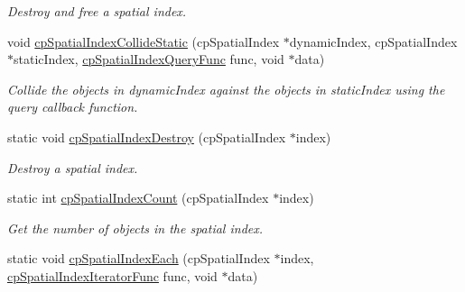 \begin{DoxyCompactItemize}
\begin{DoxyCompactList}\small\item\em Destroy and free a spatial index. \end{DoxyCompactList}\item 
\hypertarget{group__cp_spatial_index_ga8abb667968f231b2f87c7273d4b0e533}{}void \hyperlink{group__cp_spatial_index_ga8abb667968f231b2f87c7273d4b0e533}{cp\+Spatial\+Index\+Collide\+Static} (cp\+Spatial\+Index $\ast$dynamic\+Index, cp\+Spatial\+Index $\ast$static\+Index, \hyperlink{group__cp_spatial_index_ga7bcf80d017b29d32d9f8011405b241f9}{cp\+Spatial\+Index\+Query\+Func} func, void $\ast$data)\label{group__cp_spatial_index_ga8abb667968f231b2f87c7273d4b0e533}

\begin{DoxyCompactList}\small\item\em Collide the objects in {\ttfamily dynamic\+Index} against the objects in {\ttfamily static\+Index} using the query callback function. \end{DoxyCompactList}\item 
\hypertarget{group__cp_spatial_index_ga93050241206687a408b3fda47a3043b5}{}static void \hyperlink{group__cp_spatial_index_ga93050241206687a408b3fda47a3043b5}{cp\+Spatial\+Index\+Destroy} (cp\+Spatial\+Index $\ast$index)\label{group__cp_spatial_index_ga93050241206687a408b3fda47a3043b5}

\begin{DoxyCompactList}\small\item\em Destroy a spatial index. \end{DoxyCompactList}\item 
\hypertarget{group__cp_spatial_index_ga6df52a5b71eb17a3eefd95f6fee50523}{}static int \hyperlink{group__cp_spatial_index_ga6df52a5b71eb17a3eefd95f6fee50523}{cp\+Spatial\+Index\+Count} (cp\+Spatial\+Index $\ast$index)\label{group__cp_spatial_index_ga6df52a5b71eb17a3eefd95f6fee50523}

\begin{DoxyCompactList}\small\item\em Get the number of objects in the spatial index. \end{DoxyCompactList}\item 
\hypertarget{group__cp_spatial_index_gaf26a213bc18ecac3eb75fbffcd799516}{}static void \hyperlink{group__cp_spatial_index_gaf26a213bc18ecac3eb75fbffcd799516}{cp\+Spatial\+Index\+Each} (cp\+Spatial\+Index $\ast$index, \hyperlink{group__cp_spatial_index_ga522e250b59a1802d3648085685d41f97}{cp\+Spatial\+Index\+Iterator\+Func} func, void $\ast$data)\label{group__cp_spatial_index_gaf26a213bc18ecac3eb75fbffcd799516}


\end{DoxyCompactItemize}
